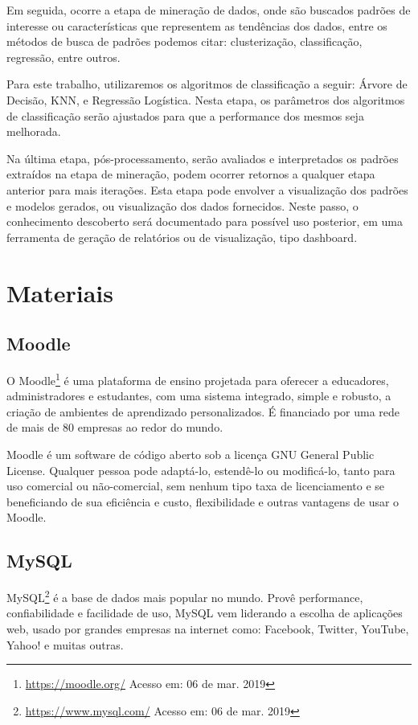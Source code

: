 Em seguida, ocorre a etapa de mineração de dados, onde são buscados padrões de
interesse ou características que representem as tendências dos dados, entre os
métodos de busca de padrões podemos citar: clusterização, classificação,
regressão, entre outros.

Para este trabalho, utilizaremos os algoritmos de classificação a seguir: Árvore
de Decisão, KNN, e Regressão Logística. Nesta etapa, os parâmetros dos
algoritmos de classificação serão ajustados para que a performance dos mesmos
seja melhorada.

Na última etapa, pós-processamento, serão avaliados e interpretados os padrões
extraídos na etapa de mineração, podem ocorrer retornos a qualquer etapa
anterior para mais iterações. Esta etapa pode envolver a visualização dos
padrões e modelos gerados, ou visualização dos dados fornecidos. Neste passo, o
conhecimento descoberto será documentado para possível uso posterior, em uma
ferramenta de geração de relatórios ou de visualização, tipo dashboard.

\section{Materiais}

\subsection{Moodle}

O Moodle\footnote{\url{https://moodle.org/} Acesso em: 06 de mar. 2019} é uma
plataforma de ensino projetada para oferecer a educadores, administradores e
estudantes, com uma sistema integrado, simple e robusto, a criação de ambientes
de aprendizado personalizados. É financiado por uma rede de mais de 80 empresas
ao redor do mundo.

Moodle é um software de código aberto sob a licença GNU General Public License.
Qualquer pessoa pode adaptá-lo, estendê-lo ou modificá-lo, tanto para uso
comercial ou não-comercial, sem nenhum tipo taxa de licenciamento e se
beneficiando de sua eficiência e custo, flexibilidade e outras vantagens de usar
o Moodle.

\subsection{MySQL}

MySQL\footnote{\url{https://www.mysql.com/} Acesso em: 06 de mar. 2019} é a base
de dados mais popular no mundo. Provê performance, confiabilidade e facilidade
de uso, MySQL vem liderando a escolha de aplicações web, usado por grandes
empresas na internet como: Facebook, Twitter, YouTube, Yahoo! e muitas outras.

